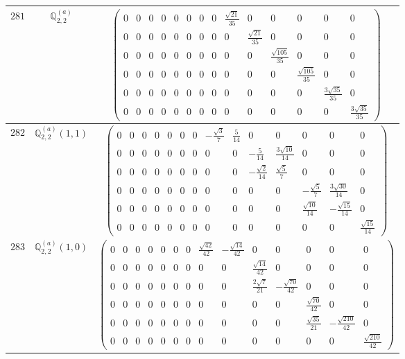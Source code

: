 \documentclass[fleqn,8pt,landscape]{jsarticle}
\begin{document}
\begin{center}
\begin{longtable}{ccc}
$ 281 $ & $ \mathbb{Q}_{2,2}^{(a)} $ & $ \begin{pmatrix} 0 & 0 & 0 & 0 & 0 & 0 & 0 & 0 & \frac{\sqrt{21}}{35} & 0 & 0 & 0 & 0 & 0 \\ 0 & 0 & 0 & 0 & 0 & 0 & 0 & 0 & 0 & \frac{\sqrt{21}}{35} & 0 & 0 & 0 & 0 \\ 0 & 0 & 0 & 0 & 0 & 0 & 0 & 0 & 0 & 0 & \frac{\sqrt{105}}{35} & 0 & 0 & 0 \\ 0 & 0 & 0 & 0 & 0 & 0 & 0 & 0 & 0 & 0 & 0 & \frac{\sqrt{105}}{35} & 0 & 0 \\ 0 & 0 & 0 & 0 & 0 & 0 & 0 & 0 & 0 & 0 & 0 & 0 & \frac{3 \sqrt{35}}{35} & 0 \\ 0 & 0 & 0 & 0 & 0 & 0 & 0 & 0 & 0 & 0 & 0 & 0 & 0 & \frac{3 \sqrt{35}}{35} \end{pmatrix} $ \\ \hline
$ 282 $ & $ \mathbb{Q}_{2,2}^{(a)}(1,1) $ & $ \begin{pmatrix} 0 & 0 & 0 & 0 & 0 & 0 & 0 & - \frac{\sqrt{3}}{7} & \frac{5}{14} & 0 & 0 & 0 & 0 & 0 \\ 0 & 0 & 0 & 0 & 0 & 0 & 0 & 0 & 0 & - \frac{5}{14} & \frac{3 \sqrt{10}}{14} & 0 & 0 & 0 \\ 0 & 0 & 0 & 0 & 0 & 0 & 0 & 0 & 0 & - \frac{\sqrt{2}}{14} & \frac{\sqrt{5}}{7} & 0 & 0 & 0 \\ 0 & 0 & 0 & 0 & 0 & 0 & 0 & 0 & 0 & 0 & 0 & - \frac{\sqrt{5}}{7} & \frac{3 \sqrt{30}}{14} & 0 \\ 0 & 0 & 0 & 0 & 0 & 0 & 0 & 0 & 0 & 0 & 0 & \frac{\sqrt{10}}{14} & - \frac{\sqrt{15}}{14} & 0 \\ 0 & 0 & 0 & 0 & 0 & 0 & 0 & 0 & 0 & 0 & 0 & 0 & 0 & \frac{\sqrt{15}}{14} \end{pmatrix} $ \\ \hline
$ 283 $ & $ \mathbb{Q}_{2,2}^{(a)}(1,0) $ & $ \begin{pmatrix} 0 & 0 & 0 & 0 & 0 & 0 & 0 & \frac{\sqrt{42}}{42} & - \frac{\sqrt{14}}{42} & 0 & 0 & 0 & 0 & 0 \\ 0 & 0 & 0 & 0 & 0 & 0 & 0 & 0 & 0 & \frac{\sqrt{14}}{42} & 0 & 0 & 0 & 0 \\ 0 & 0 & 0 & 0 & 0 & 0 & 0 & 0 & 0 & \frac{2 \sqrt{7}}{21} & - \frac{\sqrt{70}}{42} & 0 & 0 & 0 \\ 0 & 0 & 0 & 0 & 0 & 0 & 0 & 0 & 0 & 0 & 0 & \frac{\sqrt{70}}{42} & 0 & 0 \\ 0 & 0 & 0 & 0 & 0 & 0 & 0 & 0 & 0 & 0 & 0 & \frac{\sqrt{35}}{21} & - \frac{\sqrt{210}}{42} & 0 \\ 0 & 0 & 0 & 0 & 0 & 0 & 0 & 0 & 0 & 0 & 0 & 0 & 0 & \frac{\sqrt{210}}{42} \end{pmatrix} $ \\ \hline

\end{longtable}
\end{center}
\end{document}

